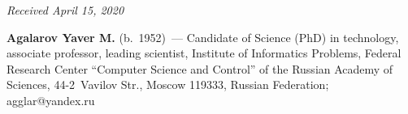 \vspace*{-6pt}

\hfill{\small\textit{Received April 15, 2020}}


   


   \Contrl
   
   \noindent
   \textbf{Agalarov Yaver M.} (b.\ 1952)~--- Candidate of Science (PhD) in technology, associate 
professor, leading scientist, Institute of Informatics Problems, Federal Research Center ``Computer Science 
and Control'' of the Russian Academy of Sciences, 44-2~Vavilov Str., Moscow 119333, Russian Federation; 
\mbox{agglar@yandex.ru}
   
\label{end\stat}

\renewcommand{\bibname}{\protect\rm Литература} 